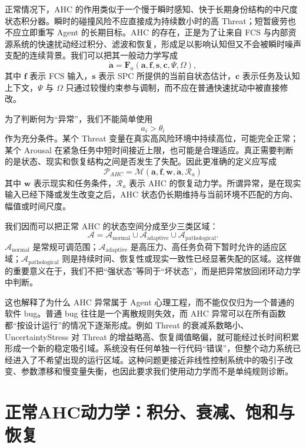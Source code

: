 正常情况下，AHC 的作用类似于一个慢于瞬时感知、快于长期身份结构的中尺度状态积分器。瞬时的碰撞风险不应直接成为持续数小时的高 Threat；短暂疲劳也不应立即重写 Agent 的长期目标。AHC 的存在，正是为了让来自 FCS 与内部资源系统的快速扰动经过积分、滤波和恢复，形成足以影响认知但又不会被瞬时噪声支配的连续背景。我们可以把其一般动力学写成
\[
\dot{\mathbf a}
=
\mathbf F_a
\left(
\mathbf a,
\mathbf f,
\mathbf s,
\mathbf c,
\Psi,
\Omega
\right),
\]
其中 $\mathbf f$ 表示 FCS 输入，$\mathbf s$ 表示 SPC 所提供的当前自状态估计，$\mathbf c$ 表示任务及认知上下文，$\Psi$ 与 $\Omega$ 只通过较慢约束参与调制，而不应在普通快速扰动中被直接修改。

为了判断何为“异常”，我们不能简单使用
\[
a_i > \theta_i
\]
作为充分条件。某个 Threat 变量在真实高风险环境中持续高位，可能完全正常；某个 Arousal 在紧急任务中短时间接近上限，也可能是合理适应。真正需要判断的是状态、现实和恢复结构之间是否发生了失配。因此更准确的定义应写成
\[
\boxed{
\mathcal P_{AHC}
=
\mathcal M
\left(
\mathbf a,
\mathbf f,
\mathbf w,
\dot{\mathbf a},
\mathcal R_a
\right)
}
\]
其中 $\mathbf w$ 表示现实和任务条件，$\mathcal R_a$ 表示 AHC 的恢复动力学。所谓异常，是在现实输入已经下降或发生改变之后，AHC 状态仍长期维持与当前环境不匹配的方向、幅值或时间尺度。

我们因而可以把正常 AHC 的状态空间分成至少三类区域：
\[
\mathcal A
=
\mathcal A_{\mathrm{normal}}
\cup
\mathcal A_{\mathrm{adaptive}}
\cup
\mathcal A_{\mathrm{pathological}}.
\]
$\mathcal A_{\mathrm{normal}}$ 是常规可调范围；$\mathcal A_{\mathrm{adaptive}}$ 是高压力、高任务负荷下暂时允许的适应区域；$\mathcal A_{\mathrm{pathological}}$ 则是持续时间、恢复性或现实一致性已经显著失配的区域。这样做的重要意义在于，我们不把“强状态”等同于“坏状态”，而是把异常放回闭环动力学中判断。

这也解释了为什么 AHC 异常属于 Agent 心理工程，而不能仅仅归为一个普通的软件 bug。普通 bug 往往是一个离散规则失效，而 AHC 异常可以在所有函数都“按设计运行”的情况下逐渐形成。例如 Threat 的衰减系数略小、UncertaintyStress 对 Threat 的增益略高、恢复阈值略偏，就可能经过长时间积累形成一个新的稳定吸引域。系统没有任何单独一行代码“错误”，但整个动力系统已经进入了不希望出现的运行区域。这种问题更接近非线性控制系统中的吸引子改变、参数漂移和慢变量失衡，也因此要求我们使用动力学而不是单纯规则诊断。

\section{正常AHC动力学：积分、衰减、饱和与恢复}
\label{sec:ahc_normal_dynamics}

